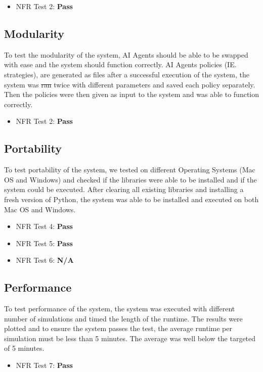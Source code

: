 \documentclass[12pt, titlepage]{article}
\providecommand{\DIFaddtex}[1]{{\protect\color{blue}\uwave{#1}}} %
\providecommand{\DIFdeltex}[1]{{\protect\color{red}\sout{#1}}}                      %
\providecommand{\DIFaddbegin}{} %
\providecommand{\DIFaddend}{} %
\providecommand{\DIFdelbegin}{} %
\providecommand{\DIFdelend}{} %
\providecommand{\DIFadd}[1]{\texorpdfstring{\DIFaddtex{#1}}{#1}} %
\providecommand{\DIFdel}[1]{\texorpdfstring{\DIFdeltex{#1}}{}} %
\begin{document}
\begin{itemize}
    \item NFR Test 2: \textbf{Pass}
\end{itemize}

\subsection{Modularity}
To test the modularity of the system, AI Agents should be able to be swapped with ease and the system should function correctly. AI Agents policies (IE. strategies), are generated as files after a successful execution of the system, the system was \DIFdelbegin \DIFdel{ran }\DIFdelend \DIFaddbegin \DIFadd{run }\DIFaddend twice with different parameters and saved each policy separately. Then the policies were then given as input to the system and was able to function correctly.
\begin{itemize}
    \item NFR Test 2: \textbf{Pass}
\end{itemize}

\subsection{Portability}
To test portability of the system, we tested on different Operating Systems (Mac OS and Windows) and checked if the libraries were able to be installed and if the system could be executed. After clearing all existing libraries and installing a fresh version of Python, the system was able to be installed and executed on both Mac OS and Windows.
\begin{itemize}
    \item NFR Test 4: \textbf{Pass}
    \item NFR Test 5: \textbf{Pass}
    \item NFR Test 6: \textbf{N/A}

\end{itemize}
\subsection{Performance}
To test performance of the system, the system was executed with different number of simulations and timed the length of the runtime. The results were plotted and to ensure the system passes the test, the average runtime per simulation must be less than 5 minutes. The average was well below the targeted of 5 minutes. 

\begin{itemize}
    \item NFR Test 7: \textbf{Pass}
\end{itemize}
\end{document}

